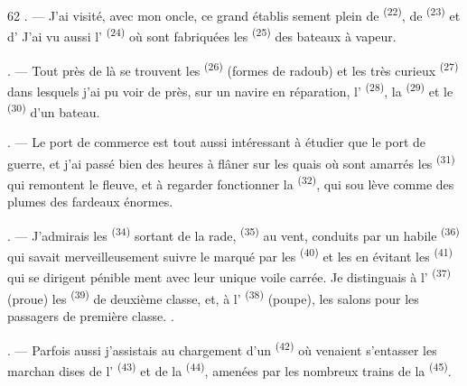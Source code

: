 \begin{VUpage}[64]{62}
. --- J'ai visité, avec mon oncle, ce grand établis\cc
sement plein de  \textsuperscript{(22)}, de  \textsuperscript{(23)} et d'\nl
J'ai vu aussi l' \textsuperscript{(24)} où sont\nl
fabriquées les  \textsuperscript{(25)} des bateaux à vapeur.

. --- Tout près de là se trouvent les  \textsuperscript{(26)}\nl
(formes de radoub) et les très curieux \cc
{} \textsuperscript{(27)} dans lesquels j'ai pu voir de près, sur un\nl
navire en réparation, l' \textsuperscript{(28)}, la  \textsuperscript{(29)} et le\nl
{} \textsuperscript{(30)} d'un bateau.

. --- Le port de commerce est tout aussi intéressant\nl
à étudier que le port de guerre, et j'ai passé bien des\nl
heures à flâner sur les quais où sont amarrés les\nl
{} \textsuperscript{(31)} qui remontent le fleuve, et à\nl
regarder fonctionner la  \textsuperscript{(32)}, qui sou\cc
lève comme des plumes des fardeaux énormes.

. --- J'admirais les  \textsuperscript{(34)} sortant\nl
de la rade,  \textsuperscript{(35)} au vent, conduits par un\nl
habile  \textsuperscript{(36)} qui savait merveilleusement suivre\nl
le  marqué par les  \textsuperscript{(40)} et les \nl
en évitant les  \textsuperscript{(41)} qui se dirigent pénible\cc
ment avec leur unique voile carrée. Je distinguais\nl
à l' \textsuperscript{(37)} (proue) les  \textsuperscript{(39)} de deuxième\nl
classe, et, à l' \textsuperscript{(38)} (poupe), les salons pour les\nl
passagers de première classe. .

. --- Parfois aussi j'assistais au chargement d'un\nl
{} \textsuperscript{(42)} où venaient s'entasser les marchan\cc
dises de l' \textsuperscript{(43)} et de la  \textsuperscript{(44)},\nl
amenées par les nombreux trains de la \nl
{} \textsuperscript{(45)}.


\end{VUpage}
